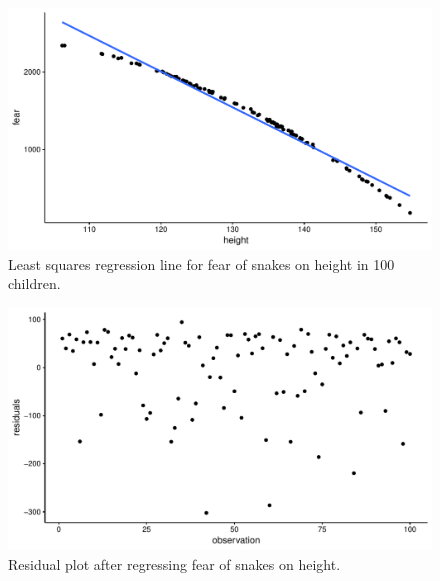 \documentclass[]{book}\usepackage[]{graphicx}\usepackage[]{color}
\makeatletter
\def\maxwidth{ %
  \ifdim\Gin@nat@width>\linewidth
    \linewidth
  \else
    \Gin@nat@width
  \fi
}
\newenvironment{knitrout}{}{} %
\makeatother
\begin{document}
\begin{knitrout}
\color{fgcolor}\begin{figure}

{\centering \includegraphics[width=\maxwidth]{figure/ass_10-1} 

}

\caption[Least squares regression line for fear of snakes on height in 100 children]{Least squares regression line for fear of snakes on height in 100 children.}\label{fig:ass_10}
\end{figure}


\end{knitrout}

\begin{knitrout}
\color{fgcolor}\begin{figure}

{\centering \includegraphics[width=\maxwidth]{figure/ass_11-1} 

}

\caption[Residual plot after regressing fear of snakes on height]{Residual plot after regressing fear of snakes on height.}\label{fig:ass_11}
\end{figure}


\end{knitrout}
\end{document}
